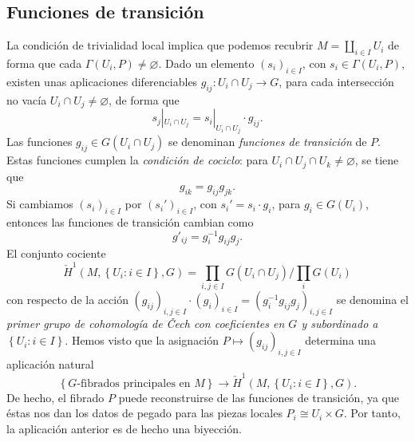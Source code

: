 \documentclass[11pt,a4paper]{amsbook}
\theoremstyle{remark} \newtheorem{rmk}[subsection]{Observación}
\theoremstyle{definition} \newtheorem{defn}[subsection]{Definición}
\theoremstyle{definition} \newtheorem{ex}[subsection]{Ejemplo}
\theoremstyle{definition} \newtheorem{ej}[subsection]{Ejercicio}
\begin{document}
\subsection{Funciones de transición} La condición de trivialidad local implica que podemos recubrir $M=\coprod_{i\in I} U_i$ de forma que cada $\Gamma(U_i,P)\neq \varnothing$. Dado un elemento $(s_i)_{i\in I}$, con $s_i\in \Gamma(U_i,P)$, existen unas aplicaciones diferenciables $g_{ij}:U_i \cap U_j \rightarrow G$, para cada intersección no vacía $U_i\cap U_j \neq \varnothing$, de forma que
          \begin{equation*}
s_j|_{U_i\cap U_j}= s_i|_{U_i\cap U_j} \cdot g_{ij}.
          \end{equation*}
          Las funciones $g_{ij}\in G(U_{i}\cap U_j)$ se denominan \emph{funciones de transición} de $P$. Estas funciones cumplen la \emph{condición de cociclo}: para $U_i\cap U_j \cap U_k \neq \varnothing$, se tiene que
          \begin{equation*}
g_{ik} = g_{ij} g_{jk}.
          \end{equation*}
          Si cambiamos $(s_i)_{i\in I}$ por $(s_i')_{i\in I}$, con $s_i'=s_i \cdot g_i$, para $g_i\in G(U_i)$, entonces las funciones de transición cambian como
          \begin{equation*}
g'_{ij} = g_{i}^{-1} g_{ij} g_j.
          \end{equation*}
          El conjunto cociente
          \begin{equation*}
\check{H}^1(M,\left\{ U_i:i\in I \right\},G) = \prod_{i,j \in I} G(U_i\cap U_j) / \prod_{i} G(U_i)
          \end{equation*}
          con respecto de la acción $(g_{ij})_{i,j\in I}\cdot (g_i)_{i\in I}=(g_i^{-1}g_{ij}g_j)_{i,j \in I}$ se denomina el \emph{primer grupo de cohomología de \v{C}ech con coeficientes en $G$ y subordinado a $\left\{ U_i:i\in I \right\}$}. Hemos visto que la asignación $P\mapsto (g_{ij})_{i,j \in I}$ determina una aplicación natural
          \begin{equation*}
\left\{ G\text{-fibrados principales en }M \right\} \longrightarrow \check{H}^1(M,\left\{ U_i:i\in I \right\},G).
          \end{equation*}
De hecho, el fibrado $P$ puede reconstruirse de las funciones de transición, ya que éstas nos dan los datos de pegado para las piezas locales $P_i \cong U_i \times G$. Por tanto, la aplicación anterior es de hecho una biyección.
\end{document}
